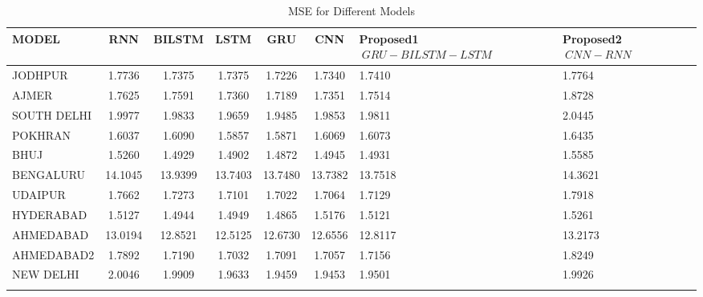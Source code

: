 \documentclass[a4paper,fleqn]{cas-sc}
\begin{document}
  \begin{table}[!ht]
    \centering
    \caption{MSE for Different Models}
    \begin{tabular}{|l|c|c|c|c|c|p{}|p{}|}
    \hline
    \textbf{MODEL} & \textbf{RNN} & \textbf{BILSTM} & \textbf{LSTM} & \textbf{GRU} & \textbf{CNN} &\textbf{Proposed1 \(\ GRU-BILSTM-LSTM \)\ } & \textbf{Proposed2 \(\ CNN-RNN\)\ } \\ \hline
    JODHPUR & 1.7736 & 1.7375 & 1.7375 & 1.7226 & 1.7340 & 1.7410 & 1.7764 \\ \hline
    AJMER & 1.7625 & 1.7591 & 1.7360 & 1.7189 & 1.7351 & 1.7514 & 1.8728 \\ \hline
    SOUTH DELHI & 1.9977 & 1.9833 & 1.9659 & 1.9485 & 1.9853 & 1.9811 & 2.0445 \\ \hline
    POKHRAN & 1.6037 & 1.6090 & 1.5857 & 1.5871 & 1.6069 & 1.6073 & 1.6435 \\ \hline
    BHUJ & 1.5260 & 1.4929 & 1.4902 & 1.4872 & 1.4945 & 1.4931 & 1.5585 \\ \hline
    BENGALURU & 14.1045 & 13.9399 & 13.7403 & 13.7480 & 13.7382 & 13.7518 & 14.3621 \\ \hline
    UDAIPUR & 1.7662 & 1.7273 & 1.7101 & 1.7022 & 1.7064 & 1.7129 & 1.7918 \\ \hline
    HYDERABAD & 1.5127 & 1.4944 & 1.4949 & 1.4865 & 1.5176 & 1.5121 & 1.5261 \\ \hline
    AHMEDABAD & 13.0194 & 12.8521 & 12.5125 & 12.6730 & 12.6556 & 12.8117 & 13.2173 \\ \hline
    AHMEDABAD2 & 1.7892 & 1.7190 & 1.7032 & 1.7091 & 1.7057 & 1.7156 & 1.8249 \\ \hline
    NEW DELHI & 2.0046 & 1.9909 & 1.9633 & 1.9459 & 1.9453 & 1.9501 & 1.9926 \\ \hline
    \label{}
    \end{tabular}
    \end{table}
    
    
    
\end{document}
